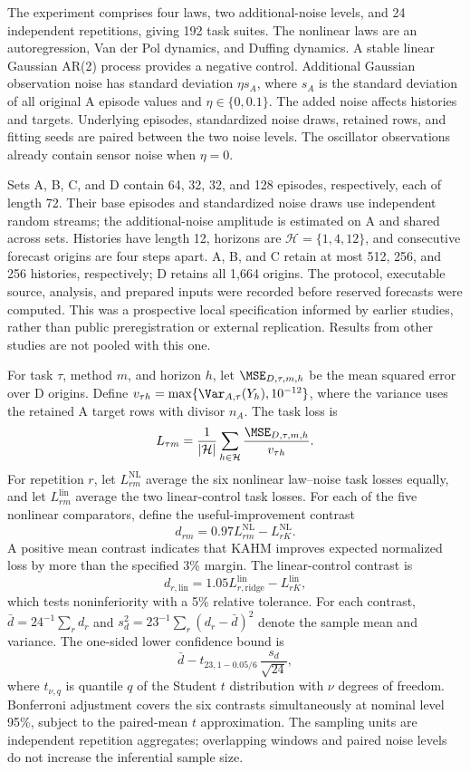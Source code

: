 The experiment comprises four laws, two additional-noise levels, and
24 independent repetitions, giving 192 task suites. The nonlinear laws
are an autoregression, Van der Pol dynamics, and Duffing dynamics. A
stable linear Gaussian AR(2) process provides a negative control.
Additional Gaussian observation noise has standard deviation $\eta s_A$,
where $s_A$ is the standard deviation of all original A episode values
and $\eta\in\{0,0.1\}$. The added noise affects histories and targets.
Underlying episodes, standardized noise draws, retained rows, and fitting
seeds are paired between the two noise levels. The oscillator observations
already contain sensor noise when $\eta=0$.

Sets A, B, C, and D contain 64, 32, 32, and 128 episodes, respectively,
each of length 72. Their base episodes and standardized noise draws use
independent random streams; the additional-noise amplitude is estimated
on A and shared across sets. Histories have length 12, horizons are
$\mathcal H=\{1,4,12\}$, and consecutive forecast origins are four
steps apart. A, B, and C retain at most 512, 256, and 256 histories,
respectively; D retains all 1,664 origins. The protocol, executable source,
analysis, and prepared inputs were recorded before reserved forecasts
were computed. This was a prospective local specification informed by
earlier studies, rather than public preregistration or external
replication. Results from other studies are not pooled with this one.

For task $\tau$, method $m$, and horizon $h$, let
$\MSE_{D,\tau,m,h}$ be the mean squared error over D origins. Define
$v_{\tau h}=\max\{\Var_{A,\tau}(Y_h),10^{-12}\}$, where the
variance uses the retained A target rows with divisor $n_A$. The task loss is
\[
 L_{\tau m}=\frac1{|\mathcal H|}\sum_{h\in\mathcal H}
       \frac{\MSE_{D,\tau,m,h}}{v_{\tau h}}.
\]
For repetition $r$, let $L^{\mathrm{NL}}_{rm}$ average the six nonlinear
law--noise task losses equally, and let $L^{\mathrm{lin}}_{rm}$ average
the two linear-control task losses. For each of the five nonlinear
comparators, define the useful-improvement contrast
\[
 d_{rm}=0.97L^{\mathrm{NL}}_{rm}-L^{\mathrm{NL}}_{rK}.
\]
A positive mean contrast indicates that KAHM improves expected normalized
loss by more than the specified 3\% margin. The linear-control contrast is
\[
 d_{r,\mathrm{lin}}=1.05L^{\mathrm{lin}}_{r,\mathrm{ridge}}
                          -L^{\mathrm{lin}}_{rK},
\]
which tests noninferiority with a 5\% relative tolerance. For each
contrast, $\bar d=24^{-1}\sum_r d_r$ and
$s_d^2=23^{-1}\sum_r(d_r-\bar d)^2$ denote the sample mean and variance.
The one-sided lower confidence bound is
\[
 \bar d-t_{23,1-0.05/6}\,\frac{s_d}{\sqrt{24}},
\]
where $t_{\nu,q}$ is quantile $q$ of the Student $t$ distribution with
$\nu$ degrees of freedom. Bonferroni adjustment covers the six contrasts
simultaneously at nominal level 95\%, subject to the paired-mean
$t$ approximation. The sampling units are independent repetition
aggregates; overlapping windows and paired noise levels do not increase
the inferential sample size.

